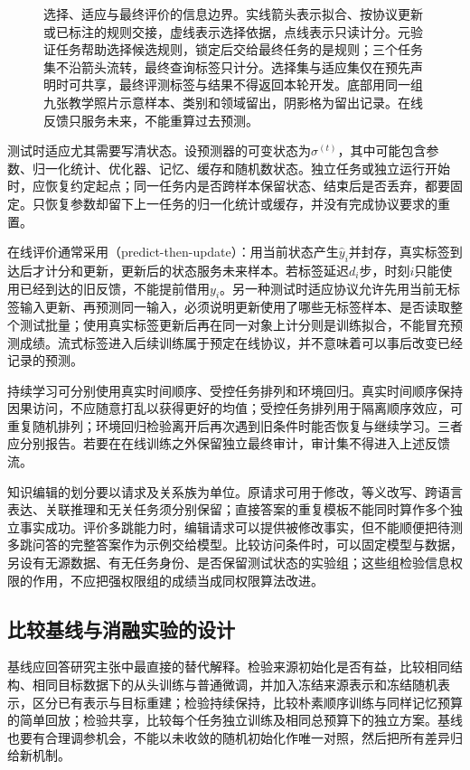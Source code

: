 \begin{figure}[htbp]
  \centering
  
  \caption{选择、适应与最终评价的信息边界。实线箭头表示拟合、按协议更新或已标注的规则交接，虚线表示选择依据，点线表示只读计分。元验证任务帮助选择候选规则，锁定后交给最终任务的是规则；三个任务集不沿箭头流转，最终查询标签只计分。选择集与适应集仅在预先声明时可共享，最终评测标签与结果不得返回本轮开发。底部用同一组九张教学照片示意样本、类别和领域留出，阴影格为留出记录。在线反馈只服务未来，不能重算过去预测。}
  \label{fig:ket-evaluation-boundaries}
\end{figure}
\FloatBarrier

测试时适应尤其需要写清状态。设预测器的可变状态为$\sigma^{(t)}$，其中可能包含参数、归一化统计、优化器、记忆、缓存和随机数状态。独立任务或独立运行开始时，应恢复约定起点；同一任务内是否跨样本保留状态、结束后是否丢弃，都要固定。只恢复参数却留下上一任务的归一化统计或缓存，并没有完成协议要求的重置。

在线评价通常采用（predict-then-update）：用当前状态产生$\hat y_i$并封存，真实标签到达后才计分和更新，更新后的状态服务未来样本。若标签延迟$d_i$步，时刻$i$只能使用已经到达的旧反馈，不能提前借用$y_i$。另一种测试时适应协议允许先用当前无标签输入更新、再预测同一输入，必须说明更新使用了哪些无标签样本、是否读取整个测试批量；使用真实标签更新后再在同一对象上计分则是训练拟合，不能冒充预测成绩。流式标签进入后续训练属于预定在线协议，并不意味着可以事后改变已经记录的预测。

持续学习可分别使用真实时间顺序、受控任务排列和环境回归。真实时间顺序保持因果访问，不应随意打乱以获得更好的均值；受控任务排列用于隔离顺序效应，可重复随机排列；环境回归检验离开后再次遇到旧条件时能否恢复与继续学习。三者应分别报告。若要在在线训练之外保留独立最终审计，审计集不得进入上述反馈流。

知识编辑的划分要以请求及关系族为单位。原请求可用于修改，等义改写、跨语言表达、关联推理和无关任务须分别保留；直接答案的重复模板不能同时算作多个独立事实成功。评价多跳能力时，编辑请求可以提供被修改事实，但不能顺便把待测多跳问答的完整答案作为示例交给模型。比较访问条件时，可以固定模型与数据，另设有无源数据、有无任务身份、是否保留测试状态的实验组；这些组检验信息权限的作用，不应把强权限组的成绩当成同权限算法改进。

\subsection{比较基线与消融实验的设计}
\label{sec:ket-evaluation-baselines}

基线应回答研究主张中最直接的替代解释。检验来源初始化是否有益，比较相同结构、相同目标数据下的从头训练与普通微调，并加入冻结来源表示和冻结随机表示，区分已有表示与目标重建；检验持续保持，比较朴素顺序训练与同样记忆预算的简单回放；检验共享，比较每个任务独立训练及相同总预算下的独立方案。基线也要有合理调参机会，不能以未收敛的随机初始化作唯一对照，然后把所有差异归给新机制。


